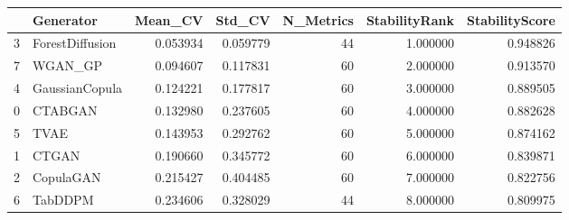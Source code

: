 \begin{tabular}{llrrrrr}
\toprule
 & Generator & Mean_CV & Std_CV & N_Metrics & StabilityRank & StabilityScore \\
\midrule
3 & ForestDiffusion & 0.053934 & 0.059779 & 44 & 1.000000 & 0.948826 \\
7 & WGAN_GP & 0.094607 & 0.117831 & 60 & 2.000000 & 0.913570 \\
4 & GaussianCopula & 0.124221 & 0.177817 & 60 & 3.000000 & 0.889505 \\
0 & CTABGAN & 0.132980 & 0.237605 & 60 & 4.000000 & 0.882628 \\
5 & TVAE & 0.143953 & 0.292762 & 60 & 5.000000 & 0.874162 \\
1 & CTGAN & 0.190660 & 0.345772 & 60 & 6.000000 & 0.839871 \\
2 & CopulaGAN & 0.215427 & 0.404485 & 60 & 7.000000 & 0.822756 \\
6 & TabDDPM & 0.234606 & 0.328029 & 44 & 8.000000 & 0.809975 \\
\bottomrule
\end{tabular}
